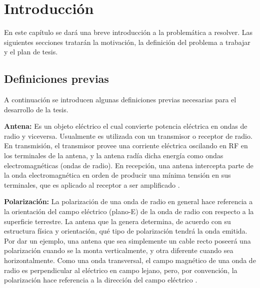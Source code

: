 
\chapter{Introducción} %

\label{ch:introduccion} %

En este capítulo se dará una breve introducción a la problemática a resolver. Las siguientes secciones tratarán la motivación,
la definición del problema a trabajar y el plan de tesis.

\section{Definiciones previas}

A continuación se introducen algunas definiciones previas necesarias para el desarrollo de la tesis.


{\textbf{Antena:}} Es un objeto eléctrico el cual convierte potencia eléctrica en ondas de radio y viceversa. Usualmente es 
utilizada con un transmisor o receptor de radio. En transmisión, el transmisor provee una corriente eléctrica oscilando en 
RF en los terminales de la antena, y la antena radía dicha energía como ondas electromagnéticas (ondas de radio). En 
recepción, una antena intercepta parte de la onda electromagnética en orden de producir una mínima tensión en sus terminales,
que es aplicado al receptor a ser amplificado \cite{AntennaWiki}.

{\textbf{Polarización:}} La polarización de una onda de radio en general hace referencia a la orientación del campo 
eléctrico (plano-E) de la onda de radio con respecto a la superficie terrestre. La antena que la genera determina, de acuerdo
con su estructura física y orientación, qué tipo de polarización tendrá la onda emitida. Por dar un ejemplo, una antena que
sea simplemente un cable recto poseerá una polarización cuando se la monta verticalmente, y otra diferente cuando sea 
horizontalmente. Como una onda transversal, el campo magnético de una onda de radio es perpendicular al eléctrico en campo 
lejano, pero, por convención, la polarización hace referencia a la dirección del campo eléctrico \cite{AntennaWiki}.

